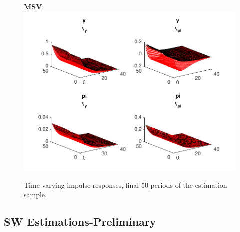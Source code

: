 \documentclass[12pt,reqno]{article}
\numberwithin{equation}{section}
\begin{document}
\begin{figure}[H]
\caption{Time-varying impulse responses, final 50 periods of the estimation sample.}

\textbf{MSV}: \\
\includegraphics[scale=1]{NKPC_ree_init_MSV_IR_timeVarying.pdf}\\
\end{figure}


\subsection*{SW Estimations-Preliminary}
\end{document}
